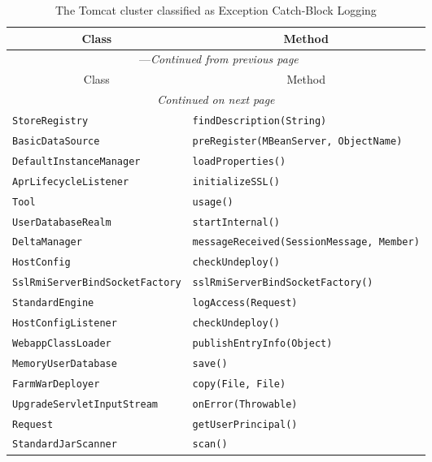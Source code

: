 \begin{center}
\begin{longtable}{ll}
\caption{The Tomcat cluster classified as Exception Catch-Block Logging}\\
\toprule\multicolumn{1}{c}{Class}&\multicolumn{1}{c}{Method}\\\midrule
\endfirsthead

\multicolumn{2}{c}{\tablename\ \thetable{}---\textit{Continued from previous page}} \\\midrule
\multicolumn{1}{c}{Class}&\multicolumn{1}{c}{Method}\\\midrule
\endhead
\multicolumn{2}{c}{\textit{Continued on next page}}\\\midrule
\endfoot
\bottomrule
\endlastfoot
\lstinline/StoreRegistry/&{\lstinline/findDescription(String)/}\\
\lstinline/BasicDataSource/&{\lstinline/preRegister(MBeanServer, ObjectName)/}\\
\lstinline/DefaultInstanceManager/&{\lstinline/loadProperties()/}\\
\lstinline/AprLifecycleListener/&{\hspace*{-3pt}\lstinline/initializeSSL()/}\\
\lstinline/Tool/&{\lstinline/usage()/}\\
\lstinline/UserDatabaseRealm/&{\hspace*{-3pt}\lstinline/startInternal()/}\\
\lstinline/DeltaManager/&{\lstinline/messageReceived(SessionMessage, Member)/}\\
\lstinline/HostConfig/&{\lstinline/checkUndeploy()/}\\
\lstinline/SslRmiServerBindSocketFactory/&{\lstinline/sslRmiServerBindSocketFactory()/}\\
\lstinline/StandardEngine/&{\lstinline/logAccess(Request)/}\\
\lstinline/HostConfigListener/&{\lstinline/checkUndeploy()/}\\
\lstinline/WebappClassLoader/&{\lstinline/publishEntryInfo(Object)/}\\
\lstinline/MemoryUserDatabase/&{\lstinline/save()/}\\
\lstinline/FarmWarDeployer/&{\lstinline/copy(File, File)/}\\
\lstinline/UpgradeServletInputStream/&{\lstinline/onError(Throwable)/}\\
\lstinline/Request/&{\lstinline/getUserPrincipal()/}\\
\lstinline/StandardJarScanner/&{\lstinline/scan()/}\\

\end{longtable}
\end{center}
